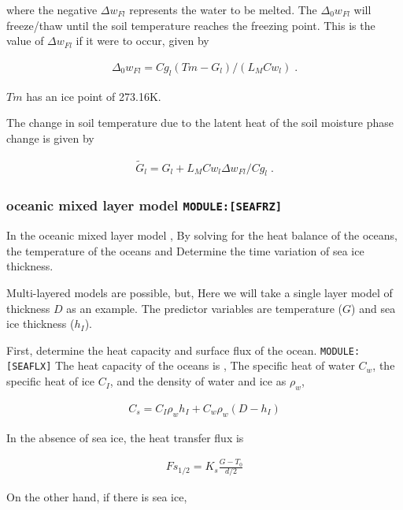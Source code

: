where the negative \(\Delta w_{Fl}\) represents the water to be melted.
The \(\Delta_0 w_{Fl}\) will freeze/thaw until the soil temperature
reaches the freezing point. This is the value of \(\Delta w_{Fl}\) if it
were to occur, given by

\begin{eqnarray}
  \Delta_0 w_{Fl} = Cg_l (Tm - G_l)/(L_M Cw_l) \; .
\end{eqnarray}

\(Tm\) has an ice point of 273.16K.

The change in soil temperature due to the latent heat of the soil
moisture phase change is given by

\begin{eqnarray}
  \tilde{G}_l = G_l + L_M Cw_l \Delta w_{Fl} / Cg_l \; .
\end{eqnarray}

\hypertarget{oceanic-mixed-layer-model-moduleseafrz}{%
\subsubsection{\texorpdfstring{oceanic mixed layer model
\texttt{MODULE:{[}SEAFRZ{]}}}{oceanic mixed layer model MODULE:{[}SEAFRZ{]}}}\label{oceanic-mixed-layer-model-moduleseafrz}}

In the oceanic mixed layer model , By solving for the heat balance of
the oceans, the temperature of the oceans and Determine the time
variation of sea ice thickness.

Multi-layered models are possible, but, Here we will take a single layer
model of thickness \(D\) as an example. The predictor variables are
temperature (\(G\)) and sea ice thickness (\(h_I\)).

First, determine the heat capacity and surface flux of the ocean.
\texttt{MODULE:{[}SEAFLX{]}} The heat capacity of the oceans is , The
specific heat of water \(C_w\), the specific heat of ice \(C_I\), and
the density of water and ice as \(\rho_w\),

\begin{eqnarray}
  C_s  = C_I \rho_w h_I +   C_w \rho_w (D - h_I)
\end{eqnarray}

In the absence of sea ice, the heat transfer flux is

\begin{eqnarray}
  Fs_{1/2} = K_s \frac{ G - T_0 }{d/2}
\end{eqnarray}

On the other hand, if there is sea ice,

